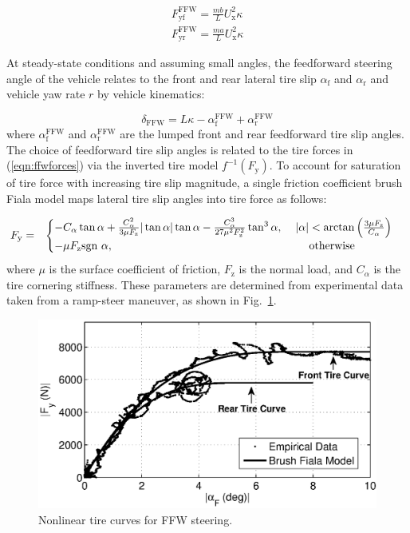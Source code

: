 \documentclass{nVSD2e}
\theoremstyle{plain}
\theoremstyle{definition}
\theoremstyle{remark}
\begin{document}
\begin{subequations}
\label{eqn:ffwforces}
\begin{align}
  F_\mathrm{yf}^\mathrm{FFW} = \frac{mb}{L} U_\mathrm{x}^2\kappa\\
   F_\mathrm{yr}^\mathrm{FFW}=\frac{ma}{L} U_\mathrm{x}^2\kappa
   \end{align}
\end{subequations}

At steady-state conditions and assuming small angles, the feedforward steering angle of the vehicle relates to the front and 
rear lateral tire slip $\alpha_\mathrm{f}$ and $\alpha_\mathrm{r}$ and vehicle yaw rate $r$ by vehicle kinematics:

\begin{equation}
\label{eqn:steadyffw}
\delta_{\mathrm{FFW}} = L\kappa - \alpha_\mathrm{f}^\mathrm{FFW}+\alpha_\mathrm{r}^\mathrm{FFW}
\end{equation}
where $\alpha_\mathrm{f}^\mathrm{FFW}$ and $\alpha_\mathrm{r}^\mathrm{FFW}$ are the lumped front and rear feedforward tire slip angles. The choice of feedforward 
tire slip angles is related to the tire forces in (\ref{eqn:ffwforces}) via the inverted tire model $f^{-1}(F_\mathrm{y})$. 
To account for saturation of tire force with increasing tire slip magnitude, a single friction coefficient brush Fiala model \cite{Pacejka2012} maps lateral 
tire slip angles into tire force as follows: 

\begin{eqnarray}
\label{eqn:fiala}
	F_\mathrm{y}&=&\begin{cases} -C_{\alpha}\tan\alpha + \frac{C_{\alpha}^2}{3\mu F_\mathrm{z}} |\tan\alpha| \tan\alpha - \frac{C_{\alpha}^3}{27\mu^2F_\mathrm{z}^2}\tan^3\alpha,
\hspace{4mm}  |\alpha| < \arctan{\left(\frac{3\mu F_\mathrm{z}}{C_\alpha}\right)} \\ -\mu F_\mathrm{z}\text{sgn} \ \alpha, \hspace{62mm} \mathrm{otherwise} \end{cases}
\end{eqnarray}
where $\mu$ is the surface coefficient of friction, $F_\mathrm{z}$ is the normal load, and $C_\alpha$ is the tire cornering stiffness. 
These parameters are determined from experimental data taken from a ramp-steer maneuver, as shown in Fig.~\ref{fig:tireCurve}.

\begin{figure}[h]
\centering
\includegraphics[width=0.85\columnwidth]{figures/FrontRearTireCurves.eps}
\caption{Nonlinear tire curves for FFW steering.}
\label{fig:tireCurve}
\end{figure}
\end{document}
